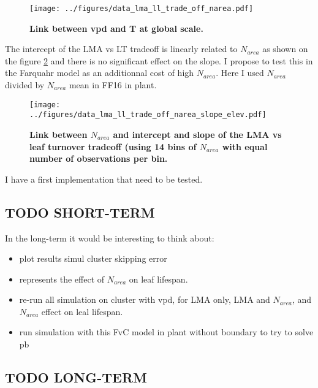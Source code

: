 \documentclass[a4paper,11pt]{article}
\begin{document}
\begin{figure}[ht]
\centering
\texttt{[image: ../figures/data\_lma\_ll\_trade\_off\_narea.pdf]}
\caption{\textbf{Link between vpd and T at global scale.}
\label{fig:narea_tradeoff}}
\end{figure}

The intercept of the LMA vs LT tradeoff is linearly related to $N_{area}$ as shown on the figure \ref{fig:narea_intercept} and there is no significant effect on the slope. I propose to test this in the Farquahr model as an additionnal cost of high $N_{area}$.  Here I used $N_{area}$ divided by $N_{area}$ mean in FF16 in plant. 

\begin{figure}[ht]
\centering
\texttt{[image: ../figures/data\_lma\_ll\_trade\_off\_narea\_slope\_elev.pdf]}
\caption{\textbf{Link between $N_{area}$ and intercept and slope of the LMA vs leaf turnover tradeoff (using 14 bins of $N_{area}$ with equal number of observations per bin.}
\label{fig:narea_intercept}}
\end{figure}

I have a first implementation that need to be tested.

\pagebreak

\subsection{TODO SHORT-TERM}

In the long-term it would be interesting to think about:

\begin{itemize}

\item  plot results simul cluster skipping error

\item represents the effect of $N_{area}$ on leaf lifespan.

\item re-run all simulation on cluster with vpd, for LMA only, LMA and $N_{area}$, and $N_{area}$ effect on leal lifespan.

\item run simulation with this FvC model in plant without boundary to try to solve pb

\end{itemize}


\subsection{TODO LONG-TERM}
\end{document}

